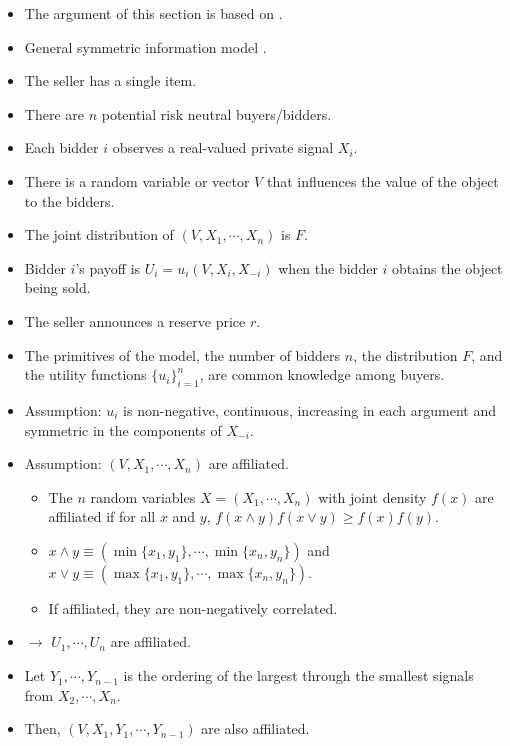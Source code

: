 \documentclass[
]{book}
\providecommand{\tightlist}{%
  \setlength{\itemsep}{0pt}\setlength{\parskip}{0pt}}
\begin{document}
\begin{itemize}
\tightlist
\item
  The argument of this section is based on \citet{hendricksChapter32Empirical2007}.
\item
  General symmetric information model \citep{milgromTheoryAuctionsCompetitive1982}.
\item
  The seller has a single item.
\item
  There are \(n\) potential risk neutral buyers/bidders.
\item
  Each bidder \(i\) observes a real-valued private signal \(X_i\).
\item
  There is a random variable or vector \(V\) that influences the value of the object to the bidders.
\item
  The joint distribution of \((V, X_1, \cdots, X_n)\) is \(F\).
\item
  Bidder \(i\)'s payoff is \(U_i = u_i(V, X_i, X_{-i})\) when the bidder \(i\) obtains the object being sold.
\item
  The seller announces a reserve price \(r\).
\item
  The primitives of the model, the number of bidders \(n\), the distribution \(F\), and the utility functions \(\{u_i\}_{i = 1}^n\), are common knowledge among buyers.
\item
  Assumption: \(u_i\) is non-negative, continuous, increasing in each argument and symmetric in the components of \(X_{-i}\).
\item
  Assumption: \((V, X_1, \cdots, X_n)\) are affiliated.

  \begin{itemize}
  \tightlist
  \item
    The \(n\) random variables \(X = (X_1, \cdots, X_n)\) with joint density \(f(x)\) are affiliated if for all \(x\) and \(y\), \(f(x \wedge y) f(x \vee y) \ge f(x) f(y)\).
  \item
    \(x \wedge y \equiv (\min\{x_1, y_1\}, \cdots, \min\{x_n, y_n\})\) and \(x \vee y \equiv (\max\{x_1, y_1\}, \cdots, \max\{x_n, y_n\})\).
  \item
    If affiliated, they are non-negatively correlated.
  \end{itemize}
\item
  \(\to\) \(U_1, \cdots, U_n\) are affiliated.
\item
  Let \(Y_1, \cdots, Y_{n - 1}\) is the ordering of the largest through the smallest signals from \(X_2, \cdots, X_n\).
\item
  Then, \((V, X_1, Y_1, \cdots, Y_{n - 1})\) are also affiliated.
\end{itemize}
\end{document}
